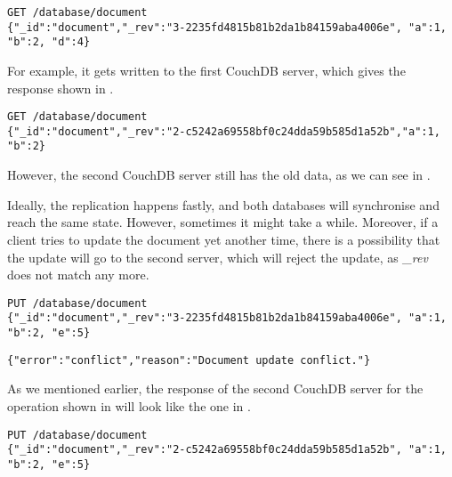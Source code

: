 \begin{lstlisting}[caption={The result of requesting the \textit{document} from CouchDB-1.}, label={lst:rwork5}]
GET /database/document
{"_id":"document","_rev":"3-2235fd4815b81b2da1b84159aba4006e", "a":1, "b":2, "d":4}
\end{lstlisting}

For example, it gets written to the first CouchDB server, which gives the response shown in .

\begin{lstlisting}[caption={The result of requesting the \textit{document} from CouchDB-2.}, label={lst:rwork6}]
GET /database/document
{"_id":"document","_rev":"2-c5242a69558bf0c24dda59b585d1a52b","a":1, "b":2}
\end{lstlisting}

However, the second CouchDB server still has the old data, as we can see in .

Ideally, the replication happens fastly, and both databases will synchronise and reach the same state. However, sometimes it might take a while. Moreover, if a client tries to update the document yet another time, there is a possibility that the update will go to the second server, which will reject the update, as \textit{\_rev} does not match any more. 

\begin{lstlisting}[caption={Updating the value of item \textit{document} by adding element \textit{e} and removing previously added element \textit{d}}, label={lst:rwork7}]
PUT /database/document
{"_id":"document","_rev":"3-2235fd4815b81b2da1b84159aba4006e", "a":1, "b":2, "e":5}
\end{lstlisting}

\begin{lstlisting}[caption={The demonstration of a conflict situation happening, when the \textit{\_rev} of sent operation and the one at the server do not match.}, label={lst:rwork8}]
{"error":"conflict","reason":"Document update conflict."}
\end{lstlisting}

As we mentioned earlier, the response of the second CouchDB server for the operation shown in  will look like the one in .

\begin{lstlisting}[caption={Updating the value of item \textit{document} by adding element \textit{e} and removing previously added element \textit{d} after receiving the new \textit{\_rev} from the second CouchDB server.}, label={lst:rwork9}]
PUT /database/document
{"_id":"document","_rev":"2-c5242a69558bf0c24dda59b585d1a52b", "a":1, "b":2, "e":5}
\end{lstlisting}


